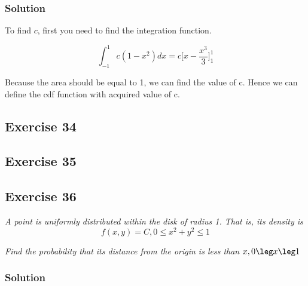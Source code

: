 \documentclass[12pt,a4paper]{article}
\begin{document}
\subsubsection{Solution}

To find $c$, first you need to find the integration function.

\[
\int_{-1}^{1} c(1-x^{2}) dx = c \Bigg[ x - \frac{x^3}{3} \Bigg]_1^1
\]

Because the area should be equal to 1, we can find the value of c. Hence we can define the cdf function with acquired value of c.


\subsection{Exercise 34}


\subsection{Exercise 35}


\subsection{Exercise 36}

\textit{A point is uniformly distributed within the disk of radius 1. That is, its density is}
\[
f(x,y) = C, 0 \leq x^2 + y^2 \leq 1
\]

\textit{Find the probability that its distance from the origin is less than $x, 0 \leg x \leg 1$}

\subsubsection{Solution}
\end{document}
